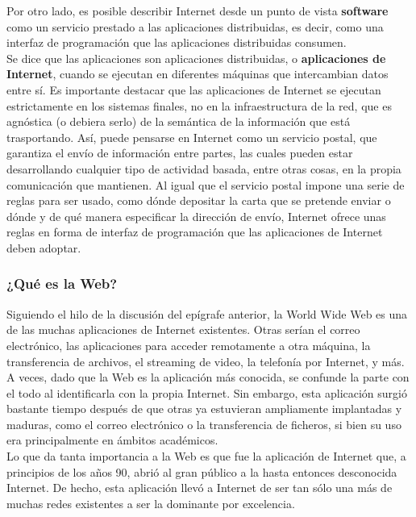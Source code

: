 \documentclass[a4paper]{report}
\begin{document}
    Por otro lado, es posible describir Internet desde un punto de vista \textbf{software} como un servicio prestado a las aplicaciones distribuidas, es decir, como una interfaz de programación que las aplicaciones distribuidas consumen.
    \\
    
    Se dice que las aplicaciones son aplicaciones distribuidas, o \textbf{aplicaciones de Internet}, cuando se ejecutan en diferentes máquinas que intercambian datos entre sí. Es importante destacar que las aplicaciones de Internet se ejecutan estrictamente en los sistemas finales, no en la infraestructura de la red, que es agnóstica (o debiera serlo) de la semántica de la información que está trasportando. Así, puede pensarse en Internet como un servicio postal, que garantiza el envío de información entre partes, las cuales pueden estar desarrollando cualquier tipo de actividad basada, entre otras cosas, en la propia comunicación que mantienen. Al igual que el servicio postal impone una serie de reglas para ser usado, como dónde depositar la carta que se pretende enviar o dónde y de qué manera especificar la dirección de envío, Internet ofrece unas reglas en forma de interfaz de programación que las aplicaciones de Internet deben adoptar.
    
    \subsubsection{¿Qué es la Web?}
    Siguiendo el hilo de la discusión del epígrafe anterior, la World Wide Web es una de las muchas aplicaciones de Internet existentes. Otras serían el correo electrónico, las aplicaciones para acceder remotamente a otra máquina, la transferencia de archivos, el streaming de video, la telefonía por Internet, y más.
    \\
    
    A veces, dado que la Web es la aplicación más conocida, se confunde la parte con el todo al identificarla con la propia Internet. Sin embargo, esta aplicación surgió bastante tiempo después de que otras ya estuvieran ampliamente implantadas y maduras, como el correo electrónico o la transferencia de ficheros, si bien su uso era principalmente en ámbitos académicos.
    \\
    
    Lo que da tanta importancia a la Web es que fue la aplicación de Internet que, a principios de los años 90, abrió al gran público a la hasta entonces desconocida Internet. De hecho, esta aplicación llevó a Internet de ser tan sólo una más de muchas redes existentes a ser la dominante por excelencia.
    \\
    
\end{document}
